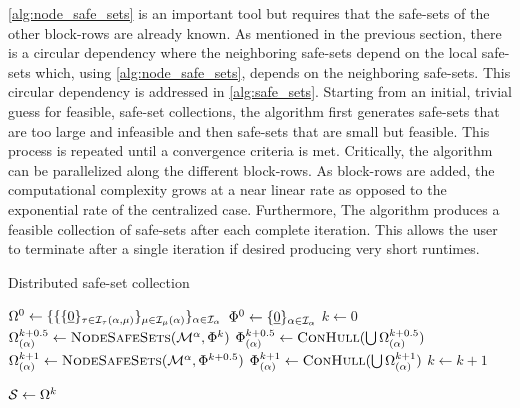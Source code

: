 \autoref{alg:node_safe_sets} is an important tool but requires that the safe-sets of the other block-rows are already known. As mentioned in the previous section, there is a circular dependency where the neighboring safe-sets depend on the local safe-sets which, using \autoref{alg:node_safe_sets}, depends on the neighboring safe-sets. This circular dependency is addressed in \autoref{alg:safe_sets}. Starting from an initial, trivial guess for feasible, safe-set collections, the algorithm first generates safe-sets that are too large and infeasible and then safe-sets that are small but feasible. This process is repeated until a convergence criteria is met. Critically, the algorithm can be parallelized along the different block-rows. As block-rows are added, the computational complexity grows at a near linear rate as opposed to the exponential rate of the centralized case. Furthermore, The algorithm produces a feasible collection of safe-sets after each complete iteration. This allows the user to terminate after a single iteration if desired producing very short runtimes. 
\begin{algorithm}[b]
\caption{Distributed safe-set collection}\label{alg:safe_sets}
\begin{algorithmic}[1]
\State $\Omega^0\gets\{\{\{\underline{0}\}_{\tau\in\mathcal{I}_\tau(\alpha,{\mu})}\}_{{\mu}\in\mathcal{I}_{\mu}(\alpha)}\}_{\alpha\in\mathcal{I}_{\alpha}}$
\State $\Phi^0\gets\{\underline{0}\}_{\alpha\in\mathcal{I}_{\alpha}}$
\State $k\gets0$
\Repeat 
		\State $\Omega^{k+0.5}_{(\agentidx)}\gets\Call{NodeSafeSets}{\modes[\agentidx], \Phi^k}$
		\State $\Phi^{k+0.5}_{(\agentidx)}\gets\Call{ConHull}{\bigcup\Omega^{k+0.5}_{(\agentidx)}}$
	\EndParFor
		\State $\Omega^{k+1}_{(\agentidx)}\gets\Call{NodeSafeSets}{\modes[\agentidx], \Phi^{k+0.5}}$
		\State $\Phi^{k+1}_{(\agentidx)}\gets\Call{ConHull}{\bigcup\Omega^{k+1}_{(\agentidx)}}$
	\EndParFor
	\State $k\gets k+1$

\State $\mathcal{S}\gets\Omega^k$
\EndProcedure
\end{algorithmic}
\end{algorithm}

